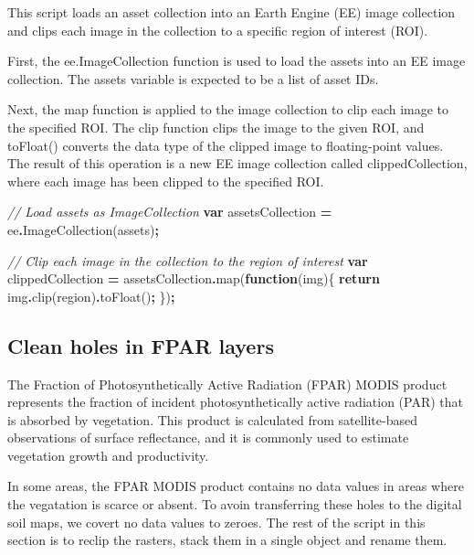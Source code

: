 \documentclass[
  10pt,
  b5paper,
  oneside]{book}
\newenvironment{Shaded}{\begin{snugshade}}{\end{snugshade}}
\newcommand{\CommentTok}[1]{\textcolor[rgb]{0.56,0.35,0.01}{\textit{#1}}}
\newcommand{\ControlFlowTok}[1]{\textcolor[rgb]{0.13,0.29,0.53}{\textbf{#1}}}
\newcommand{\FunctionTok}[1]{\textcolor[rgb]{0.00,0.00,0.00}{#1}}
\newcommand{\KeywordTok}[1]{\textcolor[rgb]{0.13,0.29,0.53}{\textbf{#1}}}
\newcommand{\NormalTok}[1]{#1}
\newcommand{\OperatorTok}[1]{\textcolor[rgb]{0.81,0.36,0.00}{\textbf{#1}}}
\begin{document}
This script loads an asset collection into an Earth Engine (EE) image collection and clips each image in the collection to a specific region of interest (ROI).

First, the ee.ImageCollection function is used to load the assets into an EE image collection. The assets variable is expected to be a list of asset IDs.

Next, the map function is applied to the image collection to clip each image to the specified ROI. The clip function clips the image to the given ROI, and toFloat() converts the data type of the clipped image to floating-point values. The result of this operation is a new EE image collection called clippedCollection, where each image has been clipped to the specified ROI.

\begin{Shaded}
\begin{Highlighting}[]
\CommentTok{// Load assets as ImageCollection}
\KeywordTok{var}\NormalTok{ assetsCollection }\OperatorTok{=}\NormalTok{ ee}\OperatorTok{.}\FunctionTok{ImageCollection}\NormalTok{(assets)}\OperatorTok{;}

\CommentTok{// Clip each image in the collection to the region of interest}
\KeywordTok{var}\NormalTok{ clippedCollection }\OperatorTok{=}\NormalTok{ assetsCollection}\OperatorTok{.}\FunctionTok{map}\NormalTok{(}\KeywordTok{function}\NormalTok{(img)\{}
  \ControlFlowTok{return}\NormalTok{ img}\OperatorTok{.}\FunctionTok{clip}\NormalTok{(region)}\OperatorTok{.}\FunctionTok{toFloat}\NormalTok{()}\OperatorTok{;}
\NormalTok{\})}\OperatorTok{;}
\end{Highlighting}
\end{Shaded}

\hypertarget{clean-holes-in-fpar-layers}{%
\subsection{Clean holes in FPAR layers}\label{clean-holes-in-fpar-layers}}

The Fraction of Photosynthetically Active Radiation (FPAR) MODIS product represents the fraction of incident photosynthetically active radiation (PAR) that is absorbed by vegetation. This product is calculated from satellite-based observations of surface reflectance, and it is commonly used to estimate vegetation growth and productivity.

In some areas, the FPAR MODIS product contains no data values in areas where the vegatation is scarce or absent. To avoin transferring these holes to the digital soil maps, we covert no data values to zeroes.
The rest of the script in this section is to reclip the rasters, stack them in a single object and rename them.
\end{document}
